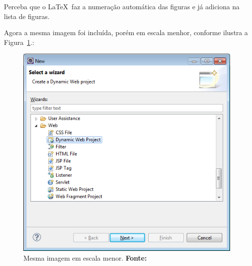 \par Perceba que o \LaTeX~faz a numeração automática das figuras e já adiciona na lista de figuras.

\par Agora a mesma imagem foi incluída, porém em escala menhor, conforme ilustra a Figura~\ref{fig:exemplo2}.:

\begin{figure}[h!]
  \centerline{\includegraphics[scale=0.25]{./imagens/apendice_img1.png}}
  \caption[Mesma imagem em escala menor]
          {Mesma imagem em escala menor. \textbf{Fonte:} \cite{correa2003plantas}}
\label{fig:exemplo2}
\end{figure}